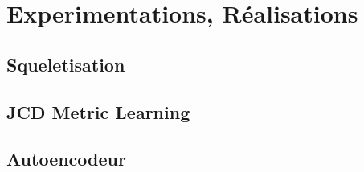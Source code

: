 \clearpage
\section{Experimentations, Réalisations}
\label{sec:SOTA}

\subsection{Squeletisation}

\subsection{JCD Metric Learning}

\subsection{Autoencodeur}